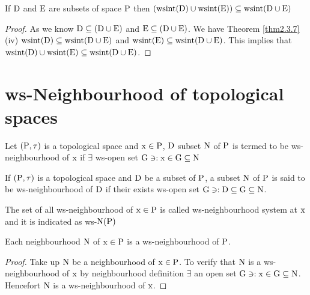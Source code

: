 \begin{thm}\label{thm2.4.6}
If $\mathrm{D}$ and $\mathrm{E}$ are subsets of space $\mathrm{P}$ then $(\mathrm{wsint}(\mathrm{D})\cup \mathrm{wsint}(\mathrm{E}))\subseteq \mathrm{wsint}(\mathrm{D}\cup \mathrm{E})$
\end{thm}

\begin{proof}
As we know $\mathrm{D}\subseteq (\mathrm{D}\cup \mathrm{E})$ and $\mathrm{E}\subseteq (\mathrm{D}\cup \mathrm{E})$. We have Theorem \ref{thm2.3.7} (iv) $\mathrm{wsint}(\mathrm{D})\subseteq \mathrm{wsint}(\mathrm{D}\cup \mathrm{E})$ and $\mathrm{wsint}(\mathrm{E})\subseteq \mathrm{wsint}(\mathrm{D}\cup \mathrm{E})$. This implies that $\mathrm{wsint}(\mathrm{D})\cup \mathrm{wsint}(\mathrm{E})\subseteq \mathrm{wsint}(\mathrm{D}\cup \mathrm{E})$.
\end{proof}


\section{ws-Neighbourhood of topological spaces}\label{sec2.5}

\begin{dfn}\label{defi2.5.1}
Let $(\mathrm{P}, \tau)$ is a topological space and $\mathrm{x}\in \mathrm{P}$, $\mathrm{D}$ subset $\mathrm{N}$ of $\mathrm{P}$ is termed to be ws-neighbourhood of $\mathrm{x}$ if $\exists$ ws-open set $\mathrm{G} \ni: \mathrm{x}\in \mathrm{G}\subseteq \mathrm{N}$
\end{dfn}

\begin{dfn}\label{defi2.5.2}
If $(\mathrm{P}, \tau)$ is a topological space and $\mathrm{D}$ be a subset of $\mathrm{P}$, a subset $\mathrm{N}$ of $\mathrm{P}$ is said to be ws-neighbourhood of $\mathrm{D}$ if their exists ws-open set $\mathrm{G} \ni: \mathrm{D}\subseteq \mathrm{G}\subseteq \mathrm{N}$.
\end{dfn}

\begin{dfn}\label{defi2.5.3}
The set of all ws-neighbourhood of $\mathrm{x}\in \mathrm{P}$ is called ws-neighbourhood system at $\mathrm{x}$ and it is indicated as ws-$\mathrm{N}(\mathrm{P})$
\end{dfn}

\begin{thm}\label{thm2.5.4}
Each neighbourhood $\mathrm{N}$ of $\mathrm{x}\in \mathrm{P}$ is a ws-neighbourhood of $\mathrm{P}$.
\end{thm}

\begin{proof}
Take up $\mathrm{N}$ be a neighbourhood of $\mathrm{x}\in \mathrm{P}$. To verify that $\mathrm{N}$ is a ws-neighbourhood of $\mathrm{x}$ by neighbourhood definition $\exists$ an open set $\mathrm{G} \ni: \mathrm{x}\in \mathrm{G}\subseteq \mathrm{N}$. Hencefort $\mathrm{N}$ is a ws-neighbourhood of $\mathrm{x}$.
\end{proof}

